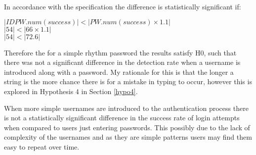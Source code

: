 \documentclass{article}
\begin{document}
In accordance with the specification the difference is statistically significant if: 
\begin{center}
    $ |IDPW.num(success)| < |PW.num(success) \times 1.1|$ \\
    $ |54| < |66 \times 1.1| $ \\
    $ |54| < |72.6| $
\end{center} 

Therefore the for a simple rhythm password the results satisfy H0, such that there was not a significant difference in the detection rate when a username is introduced along with a password. My rationale for this is that the longer a string is the more chance there is for a mistake in typing to occur, however this is explored in Hypothesis 4 in Section \ref{hypo4}.

When more simple usernames are introduced to the authentication process there is not a statistically significant difference in the success rate of login attempts when compared to users just entering passwords. This possibly due to the lack of complexity of the usernames and as they are simple patterns users may find them easy to repeat over time.  
\end{document}
